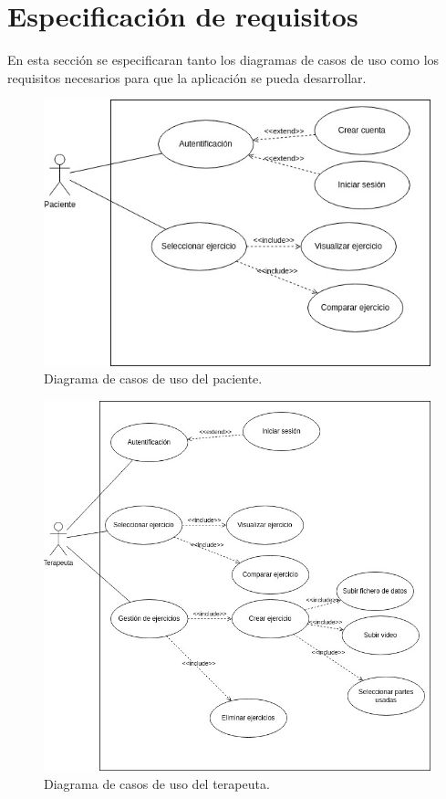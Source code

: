 \section{Especificación de requisitos}
En esta sección se especificaran tanto los diagramas de casos de uso como los requisitos necesarios para que la aplicación se pueda desarrollar.
\begin{figure}
	\centering
	\includegraphics[width=0.7\linewidth]{img/CasosDeUso-Paciente}
	\caption{Diagrama de casos de uso del paciente.}
	\label{fig:casosdeuso-paciente}
\end{figure}

\begin{figure}
	\centering
	\includegraphics[width=0.7\linewidth]{img/CasosDeUso-Terapeuta}
	\caption{Diagrama de casos de uso del terapeuta.}
	\label{fig:casosdeuso-terapeuta}
\end{figure}


